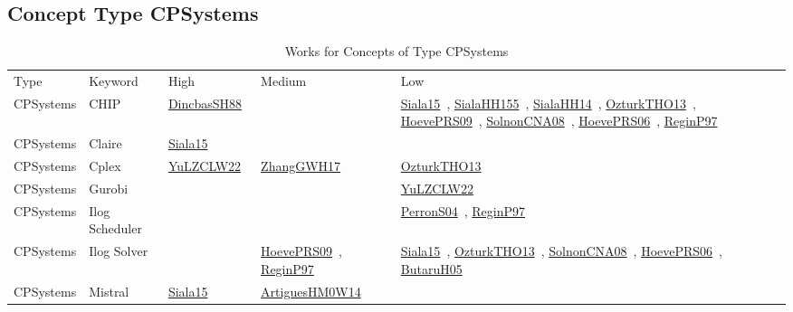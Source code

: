 \clearpage
\subsection{Concept Type CPSystems}
\label{sec:CPSystems}
{\scriptsize
\begin{longtable}{lp{3cm}>{\raggedright\arraybackslash}p{6cm}>{\raggedright\arraybackslash}p{6cm}>{\raggedright\arraybackslash}p{8cm}}
\rowcolor{white}\caption{Works for Concepts of Type CPSystems}\\ \toprule
\rowcolor{white}Type & Keyword & High & Medium & Low\\ \midrule\endhead
\bottomrule
\endfoot
CPSystems & CHIP & \href{../cars/works/DincbasSH88.pdf}{DincbasSH88}~\cite{DincbasSH88} &  & \href{../cars/works/Siala15.pdf}{Siala15}~\cite{Siala15}, \href{../cars/works/SialaHH155.pdf}{SialaHH155}~\cite{SialaHH155}, \href{../cars/works/SialaHH14.pdf}{SialaHH14}~\cite{SialaHH14}, \href{../cars/works/OzturkTHO13.pdf}{OzturkTHO13}~\cite{OzturkTHO13}, \href{../cars/works/HoevePRS09.pdf}{HoevePRS09}~\cite{HoevePRS09}, \href{../cars/works/SolnonCNA08.pdf}{SolnonCNA08}~\cite{SolnonCNA08}, \href{../cars/works/HoevePRS06.pdf}{HoevePRS06}~\cite{HoevePRS06}, \href{../cars/works/ReginP97.pdf}{ReginP97}~\cite{ReginP97}\\
CPSystems & Claire & \href{../cars/works/Siala15.pdf}{Siala15}~\cite{Siala15} &  & \\
CPSystems & Cplex & \href{../cars/works/YuLZCLW22.pdf}{YuLZCLW22}~\cite{YuLZCLW22} & \href{../cars/works/ZhangGWH17.pdf}{ZhangGWH17}~\cite{ZhangGWH17} & \href{../cars/works/OzturkTHO13.pdf}{OzturkTHO13}~\cite{OzturkTHO13}\\
CPSystems & Gurobi &  &  & \href{../cars/works/YuLZCLW22.pdf}{YuLZCLW22}~\cite{YuLZCLW22}\\
CPSystems & Ilog Scheduler &  &  & \href{../cars/works/PerronS04.pdf}{PerronS04}~\cite{PerronS04}, \href{../cars/works/ReginP97.pdf}{ReginP97}~\cite{ReginP97}\\
CPSystems & Ilog Solver &  & \href{../cars/works/HoevePRS09.pdf}{HoevePRS09}~\cite{HoevePRS09}, \href{../cars/works/ReginP97.pdf}{ReginP97}~\cite{ReginP97} & \href{../cars/works/Siala15.pdf}{Siala15}~\cite{Siala15}, \href{../cars/works/OzturkTHO13.pdf}{OzturkTHO13}~\cite{OzturkTHO13}, \href{../cars/works/SolnonCNA08.pdf}{SolnonCNA08}~\cite{SolnonCNA08}, \href{../cars/works/HoevePRS06.pdf}{HoevePRS06}~\cite{HoevePRS06}, \href{../cars/works/ButaruH05.pdf}{ButaruH05}~\cite{ButaruH05}\\
CPSystems & Mistral & \href{../cars/works/Siala15.pdf}{Siala15}~\cite{Siala15} & \href{../cars/works/ArtiguesHM0W14.pdf}{ArtiguesHM0W14}~\cite{ArtiguesHM0W14} & \\

\end{longtable}}
